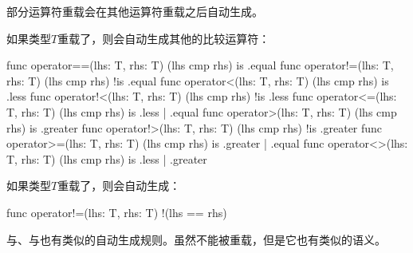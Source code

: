\pnum
部分运算符重载会在其他运算符重载之后自动生成。

\pnum
如果类型$T$重载了，则会自动生成其他的比较运算符：

\begin{codeblock}
func operator==(lhs: T, rhs: T) { (lhs cmp rhs) is .equal }
func operator!=(lhs: T, rhs: T) { (lhs cmp rhs) !is .equal }
func operator<(lhs: T, rhs: T) { (lhs cmp rhs) is .less }
func operator!<(lhs: T, rhs: T) { (lhs cmp rhs) !is .less }
func operator<=(lhs: T, rhs: T) { (lhs cmp rhs) is .less | .equal }
func operator>(lhs: T, rhs: T) { (lhs cmp rhs) is .greater }
func operator!>(lhs: T, rhs: T) { (lhs cmp rhs) !is .greater }
func operator>=(lhs: T, rhs: T) { (lhs cmp rhs) is .greater | .equal }
func operator<>(lhs: T, rhs: T) { (lhs cmp rhs) is .less | .greater }
\end{codeblock}

\pnum
如果类型$T$重载了，则会自动生成：

\begin{codeblock}
func operator!=(lhs: T, rhs: T) { !(lhs == rhs) }
\end{codeblock}

与、与也有类似的自动生成规则。\enternote 虽然不能被重载，但是它也有类似的语义。\exitnote